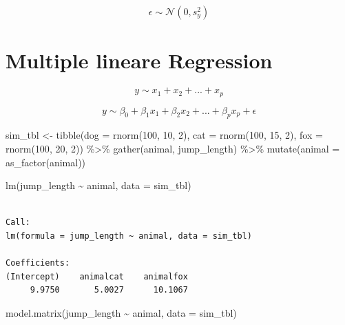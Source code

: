 \documentclass[
  letterpaper,
  DIV=11,
  oneside]{scrreport}
\newenvironment{Shaded}{\begin{snugshade}}{\end{snugshade}}
\newcommand{\AttributeTok}[1]{\textcolor[rgb]{0.40,0.45,0.13}{#1}}
\newcommand{\DecValTok}[1]{\textcolor[rgb]{0.68,0.00,0.00}{#1}}
\newcommand{\FunctionTok}[1]{\textcolor[rgb]{0.28,0.35,0.67}{#1}}
\newcommand{\NormalTok}[1]{\textcolor[rgb]{0.00,0.23,0.31}{#1}}
\newcommand{\OtherTok}[1]{\textcolor[rgb]{0.00,0.23,0.31}{#1}}
\newcommand{\SpecialCharTok}[1]{\textcolor[rgb]{0.37,0.37,0.37}{#1}}
\begin{document}
\[
\epsilon \sim \mathcal{N}(0, s^2_y)
\]

\hypertarget{multiple-lineare-regression}{%
\section*{Multiple lineare
Regression}\label{multiple-lineare-regression}}

\[
y \sim x_1 + x_2 + ... + x_p
\]

\[
y \sim \beta_0 + \beta_1 x_1 + \beta_2 x_2 + ... + \beta_p x_p + \epsilon
\]

\begin{Shaded}
\begin{Highlighting}[]
\NormalTok{sim\_tbl }\OtherTok{\textless{}{-}} \FunctionTok{tibble}\NormalTok{(}\AttributeTok{dog =} \FunctionTok{rnorm}\NormalTok{(}\DecValTok{100}\NormalTok{, }\DecValTok{10}\NormalTok{, }\DecValTok{2}\NormalTok{),}
                  \AttributeTok{cat =} \FunctionTok{rnorm}\NormalTok{(}\DecValTok{100}\NormalTok{, }\DecValTok{15}\NormalTok{, }\DecValTok{2}\NormalTok{),}
                  \AttributeTok{fox =} \FunctionTok{rnorm}\NormalTok{(}\DecValTok{100}\NormalTok{, }\DecValTok{20}\NormalTok{, }\DecValTok{2}\NormalTok{)) }\SpecialCharTok{\%\textgreater{}\%} 
  \FunctionTok{gather}\NormalTok{(animal, jump\_length) }\SpecialCharTok{\%\textgreater{}\%} 
  \FunctionTok{mutate}\NormalTok{(}\AttributeTok{animal =} \FunctionTok{as\_factor}\NormalTok{(animal))}

\FunctionTok{lm}\NormalTok{(jump\_length }\SpecialCharTok{\textasciitilde{}}\NormalTok{ animal, }\AttributeTok{data =}\NormalTok{ sim\_tbl)}
\end{Highlighting}
\end{Shaded}

\begin{verbatim}

Call:
lm(formula = jump_length ~ animal, data = sim_tbl)

Coefficients:
(Intercept)    animalcat    animalfox  
     9.9750       5.0027      10.1067  
\end{verbatim}

\begin{Shaded}
\begin{Highlighting}[]
\FunctionTok{model.matrix}\NormalTok{(jump\_length }\SpecialCharTok{\textasciitilde{}}\NormalTok{ animal, }\AttributeTok{data =}\NormalTok{ sim\_tbl)}
\end{Highlighting}
\end{Shaded}
\end{document}
